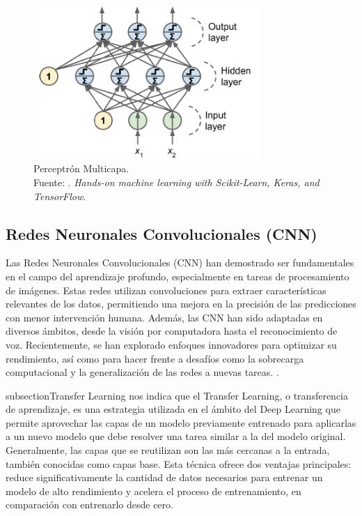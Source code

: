 \begin{figure}[H]
	\begin{center}
		\includegraphics[width=0.77\textwidth]{2/figures/mlp.png}
		\caption[Perceptrón Multicapa]{Perceptrón Multicapa. \\
		Fuente: \cite{bk_geron2022handml}. \textit{Hands-on machine learning with Scikit-Learn, Keras, and TensorFlow}.}
		\label{2:fig208}
	\end{center}
\end{figure}



\subsection{Redes Neuronales Convolucionales (CNN)} Las Redes Neuronales Convolucionales (CNN) han demostrado ser fundamentales en el campo del aprendizaje profundo, especialmente en tareas de procesamiento de imágenes. Estas redes utilizan convoluciones para extraer características relevantes de los datos, permitiendo una mejora en la precisión de las predicciones con menor intervención humana. Además, las CNN han sido adaptadas en diversos ámbitos, desde la visión por computadora hasta el reconocimiento de voz. Recientemente, se han explorado enfoques innovadores para optimizar su rendimiento, así como para hacer frente a desafíos como la sobrecarga computacional y la generalización de las redes a nuevas tareas. \parencite{9451544}.




subsection{Transfer Learning}
\cite{bk_geron2022handml} nos indica que el Transfer Learning, o transferencia de aprendizaje, es una estrategia utilizada en el ámbito del Deep Learning que permite aprovechar las capas de un modelo previamente entrenado para aplicarlas a un nuevo modelo que debe resolver una tarea similar a la del modelo original. Generalmente, las capas que se reutilizan son las más cercanas a la entrada, también conocidas como capas base. Esta técnica ofrece dos ventajas principales: reduce significativamente la cantidad de datos necesarios para entrenar un modelo de alto rendimiento y acelera el proceso de entrenamiento, en comparación con entrenarlo desde cero.

